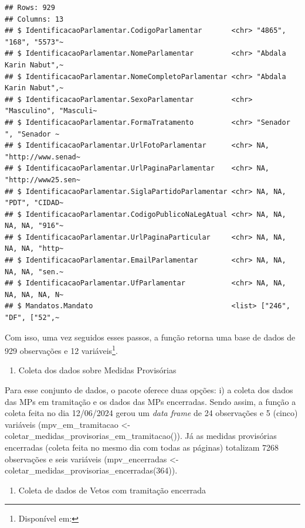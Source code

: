 \documentclass{article}
\providecommand{\tightlist}{%
  \setlength{\itemsep}{0pt}\setlength{\parskip}{0pt}}
\begin{document}
\begin{verbatim}
## Rows: 929
## Columns: 13
## $ IdentificacaoParlamentar.CodigoParlamentar       <chr> "4865", "168", "5573"~
## $ IdentificacaoParlamentar.NomeParlamentar         <chr> "Abdala Karin Nabut",~
## $ IdentificacaoParlamentar.NomeCompletoParlamentar <chr> "Abdala Karin Nabut",~
## $ IdentificacaoParlamentar.SexoParlamentar         <chr> "Masculino", "Masculi~
## $ IdentificacaoParlamentar.FormaTratamento         <chr> "Senador ", "Senador ~
## $ IdentificacaoParlamentar.UrlFotoParlamentar      <chr> NA, "http://www.senad~
## $ IdentificacaoParlamentar.UrlPaginaParlamentar    <chr> NA, "http://www25.sen~
## $ IdentificacaoParlamentar.SiglaPartidoParlamentar <chr> NA, NA, "PDT", "CIDAD~
## $ IdentificacaoParlamentar.CodigoPublicoNaLegAtual <chr> NA, NA, NA, NA, "916"~
## $ IdentificacaoParlamentar.UrlPaginaParticular     <chr> NA, NA, NA, NA, "http~
## $ IdentificacaoParlamentar.EmailParlamentar        <chr> NA, NA, NA, NA, "sen.~
## $ IdentificacaoParlamentar.UfParlamentar           <chr> NA, NA, NA, NA, NA, N~
## $ Mandatos.Mandato                                 <list> ["246", "DF", ["52",~
\end{verbatim}

Com isso, uma vez seguidos esses passos, a função retorna uma base de
dados de 929 observações e 12 variáveis\footnote{Disponível em:}.

\begin{enumerate}
\def\labelenumi{\arabic{enumi}.}
\setcounter{enumi}{1}
\tightlist
\item
  Coleta dos dados sobre Medidas Provisórias
\end{enumerate}

Para esse conjunto de dados, o pacote oferece duas opções: i) a coleta
dos dados das MPs em tramitação e os dados das MPs encerradas. Sendo
assim, a função a coleta feita no dia 12/06/2024 gerou um \emph{data
frame} de 24 observações e 5 (cinco) variáveis (mpv\_em\_tramitacao
\textless- coletar\_medidas\_provisorias\_em\_tramitacao()). Já as
medidas provisórias encerradas (coleta feita no mesmo dia com todas as
páginas) totalizam 7268 observações e seis variáveis (mpv\_encerradas
\textless- coletar\_medidas\_provisorias\_encerradas(364)).

\begin{enumerate}
\def\labelenumi{\arabic{enumi}.}
\setcounter{enumi}{2}
\tightlist
\item
  Coleta de dados de Vetos com tramitação encerrada
\end{enumerate}
\end{document}
